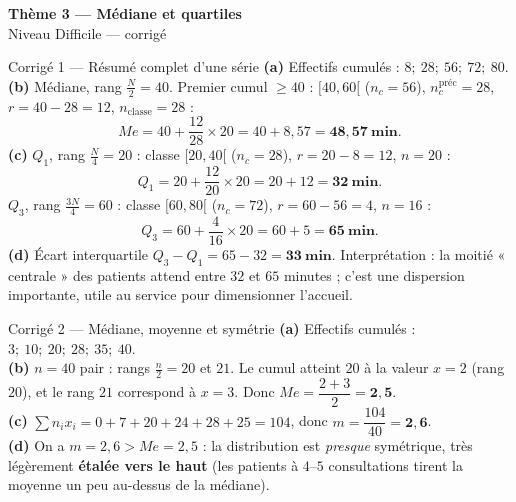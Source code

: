 \documentclass[11pt,a4paper]{article}
\newcommand{\bandeau}[2]{%
\begin{tcolorbox}[boxbase,colback=primary,colframe=primarydark,halign=center,
   before skip=2pt,after skip=12pt]
{\LARGE\bfseries\color{white} #1}\\[3pt]{\normalsize\color{white} #2}
\end{tcolorbox}}
\newcommand{\med}{M\!e}
\begin{document}
\bandeau{Thème 3 — Médiane et quartiles}{Niveau Difficile — corrigé}

\begin{corbox}{Corrigé 1 — Résumé complet d'une série}
\textbf{(a)} Effectifs cumulés : $8;\ 28;\ 56;\ 72;\ 80$.\\[2pt]
\textbf{(b)} Médiane, rang $\tfrac{N}{2}=40$. Premier cumul $\geqslant40$ : $[40,60[$ ($n_c=56$),
$n_c^{\text{préc}}=28$, $r=40-28=12$, $n_{\text{classe}}=28$ :
\[ \med=40+\frac{12}{28}\times20=40+8{,}57=\mathbf{48{,}57\ \text{min}}. \]
\textbf{(c)} $Q_1$, rang $\tfrac{N}{4}=20$ : classe $[20,40[$ ($n_c=28$), $r=20-8=12$, $n=20$ :
\[ Q_1=20+\frac{12}{20}\times20=20+12=\mathbf{32\ \text{min}}. \]
$Q_3$, rang $\tfrac{3N}{4}=60$ : classe $[60,80[$ ($n_c=72$), $r=60-56=4$, $n=16$ :
\[ Q_3=60+\frac{4}{16}\times20=60+5=\mathbf{65\ \text{min}}. \]
\textbf{(d)} Écart interquartile $Q_3-Q_1=65-32=\mathbf{33\ \text{min}}$. Interprétation : la moitié
« centrale » des patients attend entre $32$ et $65$ minutes ; c'est une dispersion importante, utile
au service pour dimensionner l'accueil.
\end{corbox}

\begin{corbox}{Corrigé 2 — Médiane, moyenne et symétrie}
\textbf{(a)} Effectifs cumulés : $3;\ 10;\ 20;\ 28;\ 35;\ 40$.\\[2pt]
\textbf{(b)} $n=40$ pair : rangs $\tfrac{n}{2}=20$ et $21$. Le cumul atteint $20$ à la valeur $x=2$
(rang $20$), et le rang $21$ correspond à $x=3$. Donc $\med=\dfrac{2+3}{2}=\mathbf{2{,}5}$.\\[2pt]
\textbf{(c)} $\sum n_i x_i=0+7+20+24+28+25=104$, donc $m=\dfrac{104}{40}=\mathbf{2{,}6}$.\\[2pt]
\textbf{(d)} On a $m=2{,}6>\med=2{,}5$ : la distribution est \emph{presque} symétrique, très
légèrement \textbf{étalée vers le haut} (les patients à $4$–$5$ consultations tirent la moyenne
un peu au-dessus de la médiane).
\end{corbox}
\end{document}
